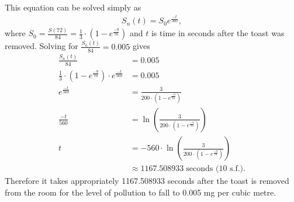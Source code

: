 \documentclass[reqno]{amsart}
\begin{document}
\begin{enumerate}[(a)]
\begin{align*}
			\end{align*}
			This equation can be solved simply as
			\begin{align*}
				S_n(t) = S_0 e^{\frac{-t}{560}},
			\end{align*}
			where $S_0 = \frac{S(72)}{84} = \frac{1}{3} \cdot \left(1 - e^{\frac{-9}{70}}\right)$ and $t$ is time in seconds after the toast was removed. Solving for $\frac{S_n(t)}{84} = 0.005$ gives
			\begin{align*}
				\frac{S_n(t)}{84} &= 0.005	\\
				\frac{1}{3} \cdot \left(1 - e^{\frac{-9}{70}}\right) \cdot e^{\frac{-t}{560}} &= 0.005	\\
				e^{\frac{-t}{560}} &= \frac{3}{200 \cdot \left(1 - e^{\frac{-9}{70}}\right)}			\\
				\frac{-t}{560} &= \ln \left( \frac{3}{200 \cdot \left(1 - e^{\frac{-9}{70}}\right)} \right)	\\
				t &= -560 \cdot \ln\left( \frac{3}{200 \cdot \left(1 - e^{\frac{-9}{70}}\right)} \right)	\\
				  &\approx 1167.508933 \; \text{seconds (10 s.f.)}.
			\end{align*}
			Therefore it takes appropriately 1167.508933 seconds after the toast is removed from the room for the level of pollution to fall to 0.005 mg per cubic metre.
	\end{enumerate}
\end{document}
